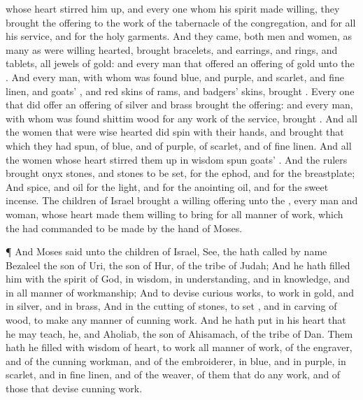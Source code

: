 {whose
heart stirred him
up, and every one whom his
spirit made
willing,
{} they
brought the
{}
offering to the
work of the
tabernacle of the
congregation, and for all his
service, and for the
holy
garments.
And they
came,
both
men and
women, as many
as were
willing
hearted,
{}
brought
bracelets, and
earrings, and
rings, and
tablets, all
jewels of
gold: and every
man that
offered
{} an
offering of
gold unto the
{}.
And every
man, with whom was
found
blue, and
purple, and
scarlet, and fine
linen, and
goats’
{}, and
red
skins of
rams, and
badgers’
skins,
brought
{}.
Every one that did
offer an
offering of
silver and
brass
brought the
{}
offering: and every man, with whom was
found
shittim
wood for any
work of the
service,
brought
{}.
And all the
women that were
wise
hearted did
spin with their
hands, and
brought that which they had
spun,
{} of
blue, and of
purple,
{} of
scarlet, and of fine
linen.
And all the
women whose
heart
stirred them up in
wisdom
spun
goats’
{}.
And the
rulers
brought
onyx
stones, and
stones to be
set, for the
ephod, and for the
breastplate;
And
spice, and
oil for the
light, and for the
anointing
oil, and for the
sweet
incense.
The
children of
Israel
brought a willing
offering unto the
{}, every
man and
woman,
whose
heart made them
willing to
bring for all manner of
work, which the
{} had
commanded to be
made by the
hand of
Moses.
\par }{\PP {}¶ And
Moses
said unto the
children of
Israel,
See, the
{} hath
called by
name
Bezaleel the
son of
Uri, the
son of
Hur, of the
tribe of
Judah;
And he hath
filled him with the
spirit of
God, in
wisdom, in
understanding, and in
knowledge, and in all manner of
workmanship;
And to
devise curious
works, to
work in
gold, and in
silver, and in
brass,
And in the
cutting of
stones, to
set
{}, and in
carving of
wood, to
make any manner of
cunning
work.
And he hath
put in his
heart that he may
teach,
{} he, and
Aholiab, the
son of
Ahisamach, of the
tribe of
Dan.
Them hath he
filled with
wisdom of
heart, to
work all manner of
work, of the
engraver, and of the cunning
workman, and of the
embroiderer, in
blue, and in
purple, in
scarlet, and in fine
linen, and of the
weaver,
{} of them that
do
any
work, and of those that
devise cunning
work.

}
